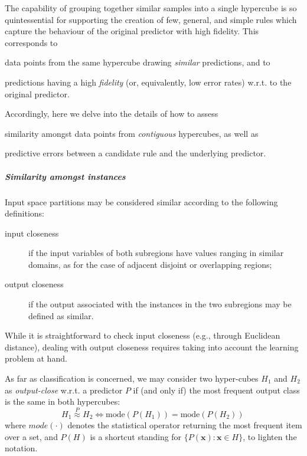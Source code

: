 \documentclass[
]{ceurart}
\begin{document}
The capability of grouping together similar samples into a single hypercube is so quintessential for supporting the creation of few, general, and simple rules which capture the behaviour of the original predictor with high fidelity.
%
This corresponds to
%
\begin{inlinelist}
	\item data points from the same hypercube drawing \emph{similar} predictions, and to
	\item predictions having a high \emph{fidelity} (or, equivalently, low error rates) w.r.t. to the original predictor.
\end{inlinelist}
%
Accordingly, here we delve into the details of how to assess
%
\begin{inlinelist}
	\item similarity amongst data points from \emph{contiguous} hypercubes, as well as
	\item predictive errors between a candidate rule and the underlying predictor.
\end{inlinelist}
%

\subparagraph{Similarity amongst instances}

Input space partitions may be considered similar according to the following definitions:
%
\begin{description}
	\item[input closeness] if the input variables of both subregions have values ranging in similar domains, as for the case of adjacent disjoint or overlapping regions;
	\item[output closeness] if the output associated with the instances in the two subregions may be defined as similar.
\end{description}
%
While it is straightforward to check input closeness (e.g., through Euclidean distance), dealing with output closeness requires taking into account the learning problem at hand.

As far as classification is concerned, we may consider two hyper-cubes $H_1$ and $H_2$ as \emph{output-close} w.r.t. a predictor $P$ if (and only if) the most frequent output class is the same in both hypercubes:
%
\begin{equation}\label{eq:simClass}
	H_1 \stackrel{P}{\approx} H_2 \Leftrightarrow \text{mode}(P(H_1)) = \text{mode}(P(H_2))\,
\end{equation}
%
where ${mode}(\cdot)$ denotes the statistical operator returning the most frequent item over a set, and $P(H)$ is a shortcut standing for $\{ P(\textbf{x}) : \textbf{x} \in H \}$, to lighten the notation.
\end{document}
